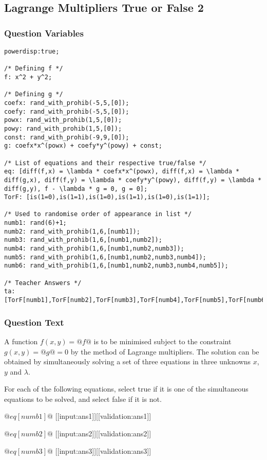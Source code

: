 \documentclass[a4paper,10pt]{article}
\begin{document}
\subsection{Lagrange Multipliers True or False 2}
\subsubsection{Question Variables}
\begin{lstlisting}
powerdisp:true;

/* Defining f */
f: x^2 + y^2;

/* Defining g */
coefx: rand_with_prohib(-5,5,[0]);
coefy: rand_with_prohib(-5,5,[0]);
powx: rand_with_prohib(1,5,[0]);
powy: rand_with_prohib(1,5,[0]);
const: rand_with_prohib(-9,9,[0]);
g: coefx*x^(powx) + coefy*y^(powy) + const;

/* List of equations and their respective true/false */
eq: [diff(f,x) = \lambda * coefx*x^(powx), diff(f,x) = \lambda * diff(g,x), diff(f,y) = \lambda * coefy*y^(powy), diff(f,y) = \lambda * diff(g,y), f - \lambda * g = 0, g = 0];
TorF: [is(1=0),is(1=1),is(1=0),is(1=1),is(1=0),is(1=1)];

/* Used to randomise order of appearance in list */
numb1: rand(6)+1;
numb2: rand_with_prohib(1,6,[numb1]);
numb3: rand_with_prohib(1,6,[numb1,numb2]);
numb4: rand_with_prohib(1,6,[numb1,numb2,numb3]);
numb5: rand_with_prohib(1,6,[numb1,numb2,numb3,numb4]);
numb6: rand_with_prohib(1,6,[numb1,numb2,numb3,numb4,numb5]);

/* Teacher Answers */
ta: [TorF[numb1],TorF[numb2],TorF[numb3],TorF[numb4],TorF[numb5],TorF[numb6]];
\end{lstlisting}
\subsubsection{Question Text}
A function $f(x,y) = @f@$ is to be minimised subject to the constraint $g(x,y) = @g@ = 0$ by the method of Lagrange multipliers. The solution can be obtained by simultaneously solving a set of three equations in three unknowns $x$, $y$ and $\lambda$.

For each of the following equations, select true if it is one of the simultaneous equations to be solved, and select false if it is not.

\( @eq[numb1]@ \)   [[input:ans1]][[validation:ans1]]

\( @eq[numb2]@ \)   [[input:ans2]][[validation:ans2]]

\( @eq[numb3]@ \)   [[input:ans3]][[validation:ans3]]
\end{document}
